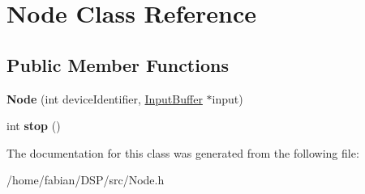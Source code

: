 \hypertarget{classNode}{\section{Node Class Reference}
\label{classNode}
}
\subsection*{Public Member Functions}
\begin{DoxyCompactItemize}
\item 
\hypertarget{classNode_aa29cbc0bd8ad0632f939c49602f7ea36}{{\bfseries Node} (int device\-Identifier, \hyperlink{classRingbuffer}{Input\-Buffer} $\ast$input)}\label{classNode_aa29cbc0bd8ad0632f939c49602f7ea36}

\item 
\hypertarget{classNode_abdbd0dda21b0fd0ab2aa84e91099ef38}{int {\bfseries stop} ()}\label{classNode_abdbd0dda21b0fd0ab2aa84e91099ef38}

\end{DoxyCompactItemize}


The documentation for this class was generated from the following file\-:\begin{DoxyCompactItemize}
\item 
/home/fabian/\-D\-S\-P/src/Node.\-h\end{DoxyCompactItemize}
